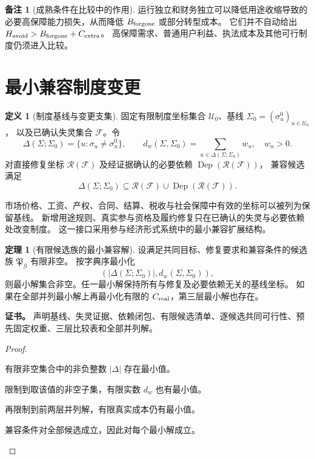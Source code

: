 \documentclass[UTF8,12pt,a4paper,openany,fontset=none,zihao=false]{ctexrep}
\theoremstyle{definition}
\newtheorem{definition}{定义}[chapter]
\newtheorem{theorem}{定理}[chapter]
\newtheorem{remark}{备注}[chapter]
\newenvironment{certificate}{\par\noindent\textbf{证书。}\ignorespaces}{\par}
\newcommand{\1}{\mathbf 1}
\begin{document}
\begin{remark}[成熟条件在比较中的作用]
运行独立和财务独立可以降低用途收缩导致的必要高保障能力损失，从而降低 \(B_{\rm forgone}\) 或部分转型成本。
它们并不自动给出 \(H_{\rm avoid}>B_{\rm forgone}+C_{\rm extra}\)。
高保障需求、普通用户利益、执法成本及其他可行制度仍须进入比较。
\end{remark}

\section{最小兼容制度变更}

\begin{definition}[制度基线与变更支集]
固定有限制度坐标集合 \(\mathcal U_0\)、基线 \(\Sigma_0=(\sigma_u^0)_{u\in\mathcal U_0}\)，
以及已确认失灵集合 \(\mathcal F\)。令
\[
\Delta(\Sigma;\Sigma_0)=\{u:\sigma_u\ne\sigma_u^0\},
\qquad
d_w(\Sigma,\Sigma_0)=\sum_{u\in\Delta(\Sigma;\Sigma_0)}w_u,
\quad w_u>0.
\]
对直接修复坐标 \(\mathcal R(\mathcal F)\) 及经证据确认的必要依赖 \(\operatorname{Dep}(\mathcal R(\mathcal F))\)，
兼容候选满足
\[
\Delta(\Sigma;\Sigma_0)
\subseteq\mathcal R(\mathcal F)\cup\operatorname{Dep}(\mathcal R(\mathcal F)).
\]
\end{definition}

市场价格、工资、产权、合同、结算、税收与社会保障中有效的坐标可以被列为保留基线。
新增用途规则、真实参与资格及履约修复只在已确认的失灵与必要依赖处改变制度。
这一接口采用参与经济形式系统中的最小兼容扩展结构\cite{InternalEconomics}。

\begin{theorem}[有限候选族的最小兼容解]
\label{opt:minimal}
设满足共同目标、修复要求和兼容条件的候选族 \(\mathfrak P_{\mathcal G}\) 有限非空。
按字典序最小化
\[
\left(\lvert\Delta(\Sigma;\Sigma_0)\rvert,
d_w(\Sigma,\Sigma_0)\right),
\]
则最小解集合非空。任一最小解保持所有与修复及必要依赖无关的基线坐标。
如果在全部并列最小解上再最小化有限的 \(C_{\rm real}\)，第三层最小解也存在。
\end{theorem}
\begin{certificate}
声明基线、失灵证据、依赖闭包、有限候选清单、逐候选共同可行性、预先固定权重、三层比较表和全部并列解。
\end{certificate}
\begin{proof}
\begin{semanticsteps}
\item 有限非空集合中的非负整数 \(\lvert\Delta\rvert\) 存在最小值。
\item 限制到取该值的非空子集，有限实数 \(d_w\) 也有最小值。
\item 再限制到前两层并列解，有限真实成本仍有最小值。
\item 兼容条件对全部候选成立，因此对每个最小解成立。
\end{semanticsteps}
\end{proof}
\end{document}
